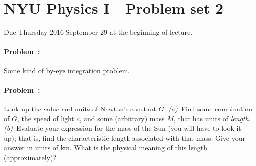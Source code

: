 \documentclass[12pt]{article}
\begin{document}
\thispagestyle{empty}

\section*{NYU Physics I---Problem set 2}

Due Thursday 2016 September 29 at the beginning of lecture.

\paragraph{Problem~\theproblem:}%
Some kind of by-eye integration problem.

\paragraph{Problem~\theproblem:}%
Look up the value and units of Newton's constant $G$.
\textsl{(a)}~Find some combination of $G$, the speed of light $c$, and
some (arbitrary) mass $M$, that has units of \emph{length}.
\textsl{(b)}~Evaluate your expression for the mass of the Sun (you
will have to look it up); that is, find the characteristic length
associated with that mass.  Give your answer in units of km.  What is
the physical meaning of this length (approximately)?
\end{document}
